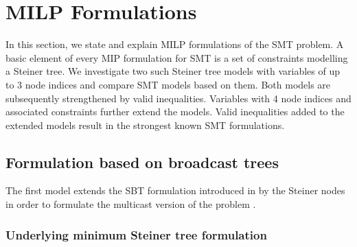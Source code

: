 \section{MILP Formulations}
\label{sec:ILP}

In this section, we state and explain MILP formulations of the SMT problem.
A basic element of every MIP formulation for SMT is a set of constraints modelling a Steiner tree.
We investigate two such Steiner tree models with variables of up to 3 node indices and compare SMT models based on them.
Both models are subsequently strengthened by valid inequalities.
Variables with 4 node indices and associated constraints further extend the models.
Valid inequalities added to the extended models result in the strongest known SMT formulations.

\subsection{Formulation based on broadcast trees}

The first model extends the SBT formulation introduced in \cite{Haugland12Dual} by the Steiner nodes in order to formulate the multicast version of the problem \cite{ivanova16isco}.

\subsubsection{Underlying minimum Steiner tree formulation}

